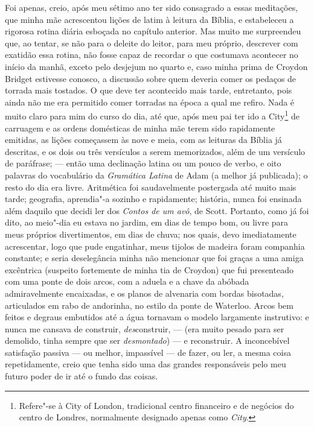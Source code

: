 Foi apenas, creio, após meu sétimo ano ter sido consagrado a essas
meditações, que minha mãe acrescentou lições de latim à leitura da
Bíblia, e estabeleceu a rigorosa rotina diária esboçada no capítulo
anterior. Mas muito me surpreendeu que, ao tentar, se não para o deleite
do leitor, para meu próprio, descrever com exatidão essa rotina, não
fosse capaz de recordar o que costumava acontecer no início da manhã,
exceto pelo desjejum no quarto e, caso minha prima de Croydon Bridget
estivesse conosco, a discussão sobre quem deveria comer os pedaços de
torrada mais tostados. O que deve ter acontecido mais tarde, entretanto,
pois ainda não me era permitido comer torradas na época a qual me
refiro. Nada é muito claro para mim do curso do dia, até que, após meu
pai ter ido a City\footnote{Refere"-se à City of London, tradicional
  centro financeiro e de negócios do centro de Londres, normalmente
  designado apenas como \textit{City}.} de carruagem e as
ordens domésticas de minha mãe terem sido rapidamente emitidas, as
lições começassem às nove e meia, com as leituras da Bíblia já
descritas, e os dois ou três versículos a serem memorizados, além de um
versículo de paráfrase; --- então uma declinação latina ou um pouco de
verbo, e oito palavras do vocabulário da \textit{Gramática Latina}
de Adam (a melhor já publicada); o resto do dia era livre. Aritmética
foi saudavelmente postergada até muito mais tarde; geografia, aprendia"-a
sozinho e rapidamente; história, nunca foi ensinada além daquilo que
decidi ler dos \textit{Contos de um avô}, de Scott. Portanto, como
já foi dito, ao meio"-dia eu estava no jardim, em dias de tempo bom, ou
livre para meus próprios divertimentos, em dias de chuva; nos quais,
devo imediatamente acrescentar, logo que pude engatinhar, meus tijolos
de madeira foram companhia constante; e seria deselegância minha não
mencionar que foi graças a uma amiga excêntrica (suspeito fortemente de
minha tia de Croydon) que fui presenteado com uma ponte de dois arcos,
com a aduela e a chave da abóbada admiravelmente encaixadas, e os planos
de alvenaria com bordas bisotadas, articulados em rabo de andorinha, no
estilo da ponte de Waterloo. Arcos bem feitos e degraus embutidos até a
água tornavam o modelo largamente instrutivo: e nunca me cansava de
construir, \textit{des}construir, --- (era muito pesado para ser demolido,
tinha sempre que ser \textit{desmontado}) --- e reconstruir. A inconcebível
satisfação passiva --- ou melhor, impassível --- de fazer, ou ler, a mesma
coisa repetidamente, creio que tenha sido uma das grandes responsáveis
pelo meu futuro poder de ir até o fundo das coisas.

